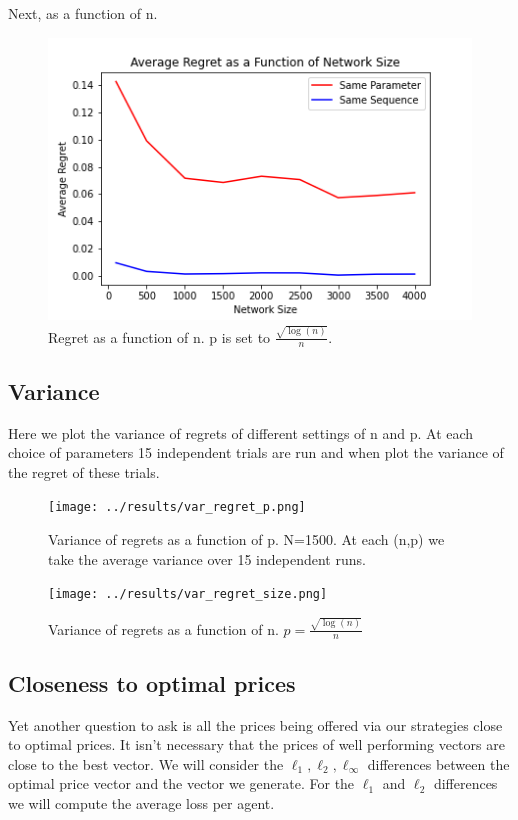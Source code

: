 \documentclass[12pt]{article}
\begin{document}
Next, as a function of n.
\begin{figure}[h]
  \centering
  \includegraphics[]{../results/regret_size.png}
  \caption{Regret as a function of n. p is set to $\frac{\sqrt{\log(n)}}{n}$.}
\end{figure}

\subsection{Variance}
Here we plot the variance of regrets of different settings of n and p. At each choice of parameters 15 independent trials are run and when plot the variance of the regret of these trials.
\begin{figure}[h]
  \centering
  \texttt{[image: ../results/var\_regret\_p.png]}
  \caption{Variance of regrets as a function of p. N=1500. At each (n,p) we take the average variance over 15 independent runs.}
\end{figure}

\begin{figure}[h]
  \centering
  \texttt{[image: ../results/var\_regret\_size.png]}
  \caption{{Variance of regrets as a function of n. $p = \frac{\sqrt{\log(n)}}{n}$}}
\end{figure}

\subsection{Closeness to optimal prices}
Yet another question to ask is all the prices being offered via our strategies close to optimal prices. It isn't necessary that the prices of well performing vectors are close to the best vector. We will consider the $\ell_{1}, \ell_{2}, \ell_{\infty}$ differences between the optimal price vector and the vector we generate. For the $\ell_{1}$ and $\ell_{2}$ differences we will compute the average loss per agent.
\end{document}
